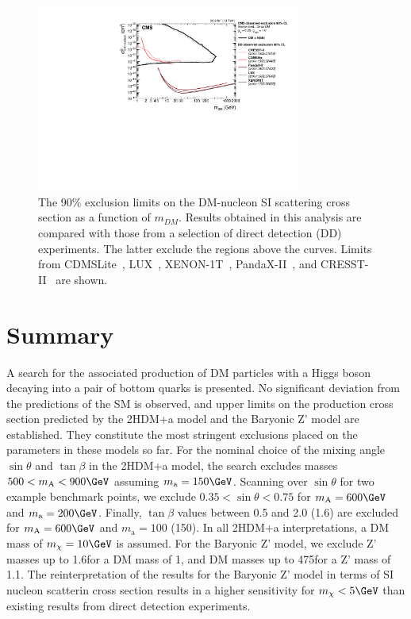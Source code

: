 \begin{figure}
  \centering
  \includegraphics[width=0.775\textwidth]{figures/limits/SpinIndepend_XsecDM_MonoHbb_bb_obs_Summary.pdf}
  \caption{The 90\% \CL exclusion limits on the DM-nucleon SI scattering cross section as a function of $m_{DM}$. 
Results obtained in this analysis are compared with those from a selection of direct detection (DD) experiments. 
The latter exclude the regions above the curves. 
Limits from CDMSLite~\cite{CDMSLite}, LUX~\cite{LUX}, XENON-1T~\cite{XENON1T}, PandaX-II~\cite{PandaxII}, and CRESST-II~\cite{CresstII} are shown.}
  \label{fig:limitsdd}
\end{figure}


\section{Summary}

A search for the associated production of DM particles with a Higgs
boson decaying into a pair of bottom quarks is presented. No significant
deviation from the predictions of the SM is observed, and upper limits on
the production cross section predicted by the 2HDM+a model and the
Baryonic Z' model are established. They constitute the  most stringent  exclusions placed on the parameters in these
models so far. For the nominal choice of the mixing angle $\sin\theta$
and $\tan\beta$ in the 2HDM+a model, the search excludes masses
$500<m_\text{A}<900\GeV$ assuming $m_\text{a}=150\GeV$. Scanning over
$\sin\theta$ for two example benchmark points, we exclude
$0.35<\sin\theta<0.75$ for $m_\text{A}=600\GeV$ and
$m_\text{a}=200\GeV$.  Finally, $\tan\beta$ values between 0.5 and 2.0
(1.6) are excluded for $m_\text{A}=600\GeV$ and $m_\text{a}=100$
(150)\GeV. In all 2HDM+a interpretations, a DM mass of $m_\chi=10\GeV$ is assumed. For the Baryonic Z' model, we exclude Z' masses up to 1.6\TeV for a DM mass of 1\GeV, and DM masses up to 475\GeV for a Z' mass of 1.1\TeV. The reinterpretation of the results for the Baryonic Z' model in terms of SI nucleon scatterin cross section results in a higher sensitivity for $m_\chi<5\GeV$ than existing results from direct detection experiments. 

 
